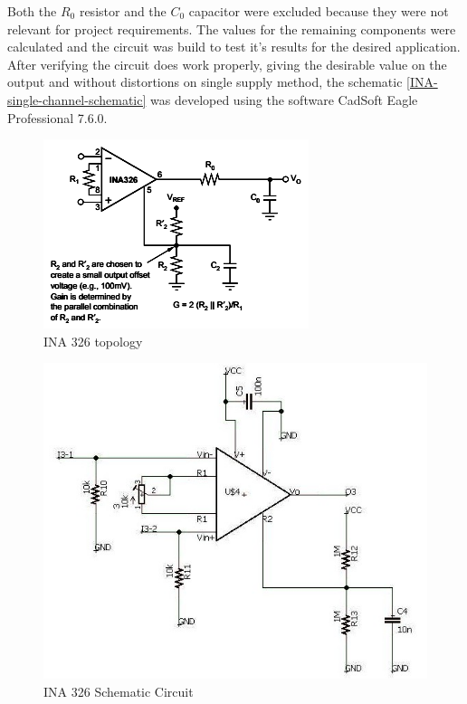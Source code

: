 Both the $R_0$ resistor and the $C_0$ capacitor were excluded because they were not
relevant for project requirements. The values for the remaining components were calculated
and the circuit was build to test it's results for the desired application.
After verifying the circuit does work properly, giving the desirable value on the output and without
distortions on single supply method, the schematic \autoref{INA-single-channel-schematic} was
developed using the software CadSoft Eagle Professional 7.6.0.
\begin{figure}[!htpb]
  \centering
  \caption{INA 326 topology}
  \label{INA_topology}
  \includegraphics[scale=0.7]{images/INA/datasheet}
\end{figure}

\begin{figure}[!htpb]
  \centering
  \caption{INA 326 Schematic Circuit}
  \label{INA-single-channel-schematic}
  \includegraphics[scale=0.65]{images/INA/single-channel-schematic}
\end{figure}


